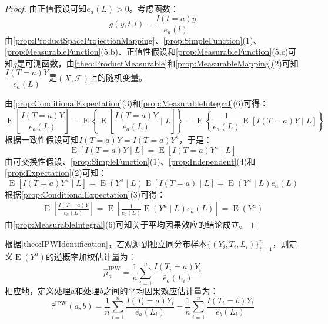 \begin{proof}
	由正值假设可知$e_a(L)>0$。考虑函数：
	\begin{equation*}
		g(y,t,l)=\frac{I(t=a)y}{e_a(l)}
	\end{equation*}
	由\cref{prop:ProductSpaceProjectionMapping}、\cref{prop:SimpleFunction}(1)、\cref{prop:MeasurableFunction}(5.b)、正值性假设和\cref{prop:MeasurableFunction}(5.c)可知$g$是可测函数，由\cref{theo:ProductMeasurable}和\cref{prop:MeasurableMapping}(2)可知$\dfrac{I(T=a)Y}{e_a(L)}$是$
	(X,\mathscr{F})$上的随机变量。\par
	由\cref{prop:ConditionalExpectation}(3)和\cref{prop:MeasurableIntegral}(6)可得：
	\begin{equation*}
		\operatorname{E}\left[\frac{I(T=a)Y}{e_a(L)}\right]=\operatorname{E}\left\{\operatorname{E}\left[\frac{I(T=a)Y}{e_a(L)}\mid L\right]\right\}=\operatorname{E}\left\{\frac{1}{e_a(L)}\operatorname{E}\left[I(T=a)Y\mid L\right]\right\}
	\end{equation*}
	根据一致性假设可知$I(T=a)Y=I(T=a)Y^a$，于是：
	\begin{equation*}
		\operatorname{E}\left[I(T=a)Y\mid L\right]=\operatorname{E}\left[I(T=a)Y^a\mid L\right]
	\end{equation*}
	由可交换性假设、\cref{prop:SimpleFunction}(1)、\cref{prop:Independent}(4)和\cref{prop:Expectation}(2)可知：
	\begin{equation*}
		\operatorname{E}\left[I(T=a)Y^a\mid L\right]=\operatorname{E}(Y^a\mid L)\operatorname{E}[I(T=a)\mid L]=\operatorname{E}(Y^a\mid L)e_a(L)
	\end{equation*}
	根据\cref{prop:ConditionalExpectation}(3)可得：
	\begin{align*}
		\operatorname{E}\left[\frac{I(T=a)Y}{e_a(L)}\right]=\operatorname{E}\left[\frac{1}{e_a(L)}\operatorname{E}(Y^a\mid L)e_a(L)\right]=\operatorname{E}(Y^a)
	\end{align*}
	由\cref{prop:MeasurableIntegral}(6)可知关于平均因果效应的结论成立。
\end{proof}
\begin{definition}
	根据\cref{theo:IPWIdentification}，若观测到独立同分布样本$\{(Y_i,T_i,L_i)\}_{i=1}^n$，则定义$\operatorname{E}(Y^a)$的逆概率加权估计量为：
	\begin{equation*}
		\hat{\mu}_a^{\text{IPW}}=\frac{1}{n}\sum_{i=1}^n\frac{I(T_i=a)Y_i}{\hat{e}_a(L_i)}
	\end{equation*}
	相应地，定义处理$a$和处理$b$之间的平均因果效应估计量为：
	\begin{equation*}
		\hat{\tau}^{\text{IPW}}(a,b)=\frac{1}{n}\sum_{i=1}^n\frac{I(T_i=a)Y_i}{\hat e_a(L_i)}-\frac{1}{n}\sum_{i=1}^n\frac{I(T_i=b)Y_i}{\hat e_b(L_i)}
	\end{equation*}
\end{definition}
